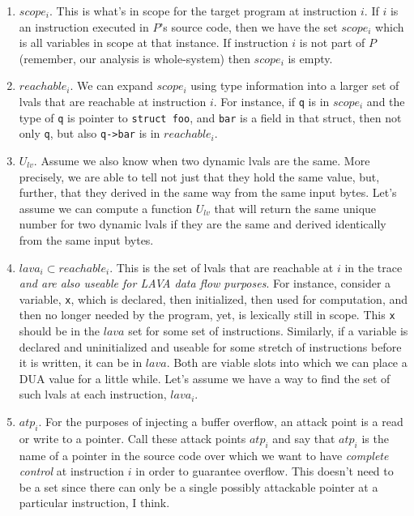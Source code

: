 \documentclass{article}
\begin{document}
\begin{enumerate}

\item $scope_i$.  This is what's in scope for the target program at instruction $i$.  If $i$ is an instruction executed in $P$'s source code, then we have the set $scope_i$ which is all variables in scope at that instance.  If instruction $i$ is not part of $P$ (remember, our analysis is whole-system) then $scope_i$ is  empty.  

\item $reachable_i$.  We can expand $scope_i$ using type information into a larger set of lvals that are reachable at instruction $i$.  For instance, if \verb+q+ is in $scope_i$ and the type of \verb+q+ is pointer to \verb+struct foo+, and \verb+bar+ is a field in that struct, then not only \verb+q+, but also \verb+q->bar+ is in $reachable_i$.  

\item $U_{lv}$.  Assume we also know when two dynamic lvals are the same.  More precisely, we are able to tell not just that they hold the same value, but, further, that they derived in the same way from the same input bytes.  Let's assume we can compute a function $U_{lv}$ that will return the same unique number for two dynamic lvals if they are the same and derived identically from the same input bytes.  

\item $lava_i \subset reachable_i$.  This is the set of lvals that are reachable at $i$ in the trace \emph{and are also useable for LAVA data flow purposes}.  For instance, consider a variable, \verb+x+, which is declared, then initialized, then used for computation, and then no longer needed by the program, yet, is lexically still in scope.  This 
\verb+x+ should be in the $lava$ set for some set of instructions.  Similarly, if a variable is declared and uninitialized and useable for some stretch of instructions before it is written, it can be in $lava$.  Both are viable slots into which we can place a DUA value for a little while.  Let's assume we have a way to find the set of such lvals at each instruction, $lava_i$. 

\item $atp_i$. For the purposes of injecting a buffer overflow, an attack point is a read or write to a pointer.   Call these attack points $atp_i$ and say that $atp_i$ is the name of a pointer in the source code over which we want to have \emph{complete control} at instruction $i$ in order to guarantee overflow.  This doesn't need to be a set since there can only be a single possibly attackable pointer at a particular instruction, I think.  



\end{enumerate}
\end{document}
